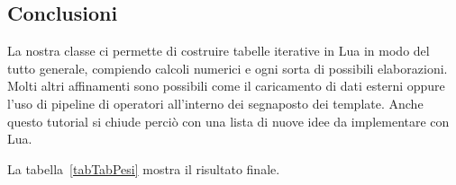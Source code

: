 \subsection{Conclusioni}

La nostra classe  ci permette di costruire tabelle iterative in Lua in
modo del tutto generale, compiendo calcoli numerici e ogni sorta di possibili
elaborazioni. Molti altri affinamenti sono possibili come il caricamento di dati
esterni oppure l'uso di pipeline di operatori all'interno dei segnaposto dei
template. Anche questo tutorial si chiude perciò con una lista di nuove idee da
implementare con Lua.

La tabella~\ref{tabTabPesi} mostra il risultato finale.

